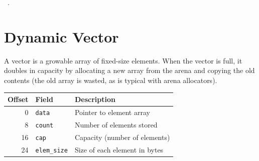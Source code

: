 \documentclass[11pt,a4paper,twoside,openright,DIV=15]{scrbook}
\theoremstyle{definition}
\theoremstyle{plain}
\theoremstyle{remark}
\begin{document}
\begin{flushleft}
\begin{minipage}{\linewidth}
\vspace{-1.5ex}
\footnotesize
\begin{list}{}{\setlength{\itemsep}{-\parsep}\setlength{\itemindent}{-\leftmargin}}
\item \NWtxtMacroRefIn\ .

\item{}
\end{list}
\end{minipage}\vspace{4ex}
\end{flushleft}
\section{Dynamic Vector}

A vector is a growable array of fixed-size elements.  When the vector
is full, it doubles in capacity by allocating a new array from the
arena and copying the old contents (the old array is wasted, as is
typical with arena allocators).

\begin{center}
\begin{tabular}{rll}
\hline
Offset & Field & Description \\
\hline
0  & \texttt{data}      & Pointer to element array \\
8  & \texttt{count}     & Number of elements stored \\
16 & \texttt{cap}       & Capacity (number of elements) \\
24 & \texttt{elem\_size} & Size of each element in bytes \\
\hline
\end{tabular}
\end{center}
\end{document}
